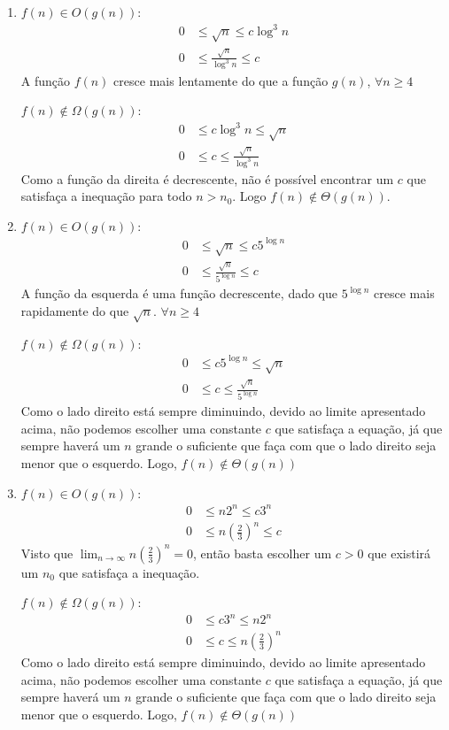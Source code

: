 \documentclass{article}
\begin{document}
\begin{enumerate}
\begin{enumerate}
		\item $f(n) \in O(g(n))$:
		\begin{align*}
      0 &\le \sqrt{n} \le c {\log^3 n} \\
      0 &\le \frac{\sqrt{n}}{{\log^3 n}} \le c
		\end{align*}
    A função $f(n)$ cresce mais lentamente do que a função $g(n)$,
    $\forall n \geq 4$

		$f(n) \notin \Omega(g(n))$:
		\begin{align*}
      0 &\le c {\log^3 n} \le \sqrt{n} \\
      0 &\le c \le \frac{\sqrt{n}}{\log^3 n}
		\end{align*}
		Como a função da direita é decrescente, não é possível encontrar
    um $c$ que satisfaça a inequação para todo $n > n_0$. Logo $f(n) \notin
		\Theta(g(n))$.

		\item $f(n) \in O(g(n))$:
		\begin{align*}
      0 &\le \sqrt{n} \le c {5^{\log n}} \\
      0 &\le \frac{\sqrt{n}}{5^{\log n}} \le c
		\end{align*}
    A função da esquerda é uma função decrescente, dado que $5^{\log n}$
    cresce mais rapidamente do que $\sqrt{n}$.
    $\forall n \geq 4$

		$f(n) \notin \Omega(g(n))$:
		\begin{align*}
      0 &\le c {5^{\log n}} \le \sqrt{n}\\
      0 &\le c \le \frac{\sqrt{n}}{5^{\log n}}
		\end{align*}
		Como o lado direito está sempre diminuindo, devido ao limite
		apresentado acima, não podemos escolher uma constante $c$ que satisfaça
		a equação, já que sempre haverá um $n$ grande o suficiente que faça com
		que o lado direito seja menor que o esquerdo. Logo, $f(n) \notin
		\Theta(g(n))$

		\item $f(n) \in O(g(n))$:
		\begin{align*}
			0 &\le n2^n \le c 3^n \\
			0 &\le n\left(\frac{2}{3}\right)^n \le c
		\end{align*}
		Visto que $\lim_{n\to\infty}n\left(\frac{2}{3}\right)^n = 0$, então
		basta escolher um $c > 0$ que existirá um $n_0$ que satisfaça a
		inequação.

		$f(n) \notin \Omega(g(n))$:
		\begin{align*}
			0 &\le c 3^n \le n 2^n \\
			0 &\le c \le n \left(\frac{2}{3}\right)^n
		\end{align*}
		Como o lado direito está sempre diminuindo, devido ao limite
		apresentado acima, não podemos escolher uma constante $c$ que satisfaça
		a equação, já que sempre haverá um $n$ grande o suficiente que faça com
		que o lado direito seja menor que o esquerdo. Logo, $f(n) \notin
		\Theta(g(n))$


\end{enumerate}
\end{enumerate}
\end{document}
